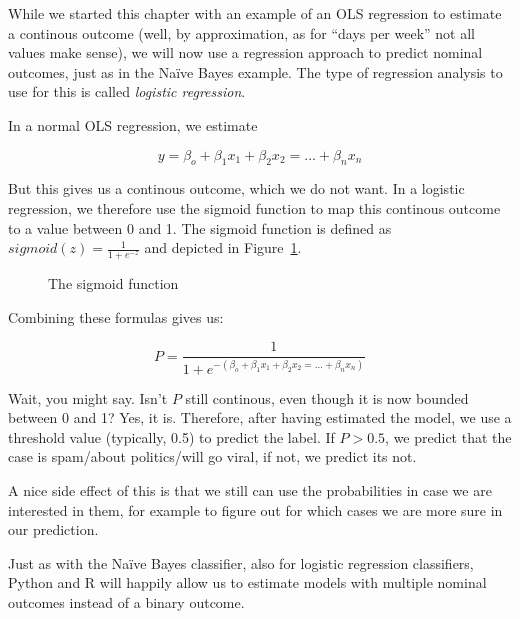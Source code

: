 While we started this chapter with an example of an OLS regression to
estimate a continous outcome (well, by approximation, as for ``days
per week'' not all values make sense), we will now use a regression
approach to predict nominal outcomes, just as in the Na\"ive Bayes
example.  The type of regression analysis to use for this is called
\emph{logistic regression}.

In a normal OLS regression, we estimate

$$y = \beta_o + \beta_1 x_1 + \beta_2 x_2 = \ldots + \beta_n x_n$$

But this gives us a continous outcome, which we do not want. In a
logistic regression, we therefore use the sigmoid function to map this
continous outcome to a value between 0 and 1. The sigmoid function is
defined as $sigmoid(z) = \frac{1}{1 + e^{-z}}$ and depicted in
Figure~\ref{fig:sigmoid}.

\begin{figure}
  \centering
{}
\caption{\label{fig:sigmoid} The sigmoid function}
\end{figure}


Combining these formulas gives us:

$$P = \frac{1}{1 + e^{-(\beta_o + \beta_1 x_1 + \beta_2 x_2 = \ldots + \beta_n x_n)}} $$


Wait, you might say. Isn't $P$ still continous, even though it is now
bounded between 0 and 1? Yes, it is.  Therefore, after having
estimated the model, we use a threshold value (typically, 0.5) to
predict the label. If $P>0.5$, we predict that the case is spam/about
politics/will go viral, if not, we predict its not.

A nice side effect of this is that we still can use the probabilities
in case we are interested in them, for example to figure out for which
cases we are more sure in our prediction.

Just as with the Na\"ive Bayes classifier, also for logistic
regression classifiers, Python and R will happily allow us to estimate
models with multiple nominal outcomes instead of a binary outcome.

